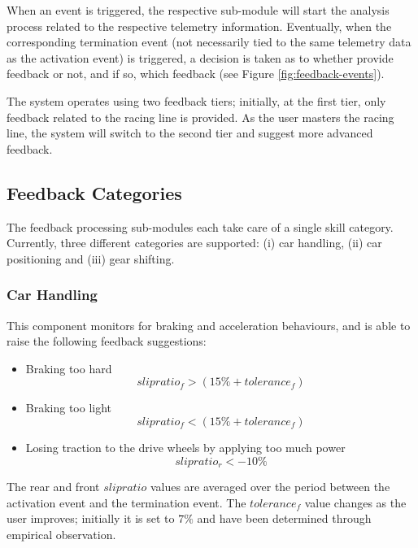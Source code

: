 When an event is triggered, the respective sub-module will start the analysis process related to the respective telemetry information. Eventually, when the corresponding termination event (not necessarily tied to the same telemetry data as the activation event) is triggered, a decision is taken as to whether provide feedback or not, and if so, which feedback (see Figure \ref{fig:feedback-events}).

The system operates using two feedback tiers; initially, at the first tier, only feedback related to the racing line is provided. As the user masters the racing line, the system will switch to the second tier and suggest more advanced feedback.

\subsection{Feedback Categories}
The feedback processing sub-modules each take care of a single skill category. Currently, three different categories are supported: (i) car handling, (ii) car positioning and (iii) gear shifting. 

\subsubsection{Car Handling}
This component monitors for braking and acceleration behaviours, and is able to raise the following feedback suggestions:
\begin{itemize}
	\item Braking too hard \\
	\begin{equation}
		slipratio_f > (15\% + tolerance_f)
	\end{equation}
	\item Braking too light
	\begin{equation}
		slipratio_f < (15\% + tolerance_f)
	\end{equation}
	\item Losing traction to the drive wheels by applying too much power
	\begin{equation}
		slipratio_r < -10\%
	\end{equation}
\end{itemize}

The rear and front $slipratio$ values are averaged over the period between the activation event and the termination event. The $tolerance_f$ value changes as the user improves; initially it is set to $7\%$ and have been determined through empirical observation.

